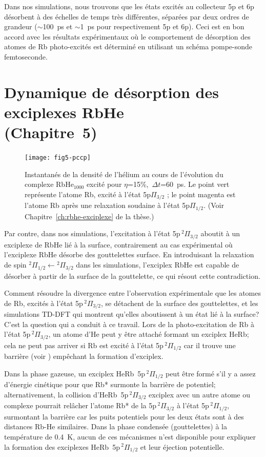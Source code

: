 		Dans nos simulations, nous trouvons que les états excités au collecteur 5p et 6p désorbent à des échelles de temps très différentes, séparées par deux ordres de grandeur ($\sim$100~ps et $\sim$1~ps pour respectivement 5p et 6p). Ceci est en bon accord avec les résultats expérimentaux où le comportement de désorption des atomes de Rb photo-excités est déterminé en utilisant un schéma pompe-sonde femtoseconde.

	\section*{Dynamique de désorption des exciplexes RbHe\\\small(Chapitre~5)}
		\begin{figure}
			\centering
			\texttt{[image: fig5-pccp]}\caption{Instantanés de la densité de l'hélium au cours de l'évolution du complexe RbHe$_{1000}$ excité pour $\eta$=15\%,~$\Delta t$=60~ps. Le point vert représente l'atome Rb, excité à l'état 5p$\Pi_{3/2}$ ; le point magenta est l'atome Rb après une relaxation soudaine à l'état 5p$\Pi_{1/2}$. (Voir Chapitre~\ref{ch:rbhe-exciplexe} de la thèse.)}
			\label{fig:snapshots}
		\end{figure}	
		Par contre, dans nos simulations, l'excitation à l'état 5p$\,^2\Pi_{3/2}$ aboutit à un exciplexe de RbHe lié à la surface, contrairement au cas expérimental où l'exciplexe RbHe désorbe des gouttelettes surface. En introduisant la relaxation de spin $^2\Pi_{1/2}\!\leftarrow\!^2\Pi_{3/2}$ dans les simulations, l'exciplex RbHe est capable de désorber à partir de la surface de la gouttelette, ce qui résout cette contradiction.
		
		Comment résoudre la divergence entre l'observation expérimentale que les atomes de Rb, excités à l'état 5p$\,^2\Pi_{3/2}$, se détachent de la surface des gouttelettes, et les simulations TD-DFT qui montrent qu'elles aboutissent à un état lié à la surface? C'est la question qui a conduit à ce travail. Lors de la photo-excitation de Rb à l'état 5p$\,^2\Pi_{3/2}$, un atome d'He peut y être attaché formant un exciplex HeRb; cela ne peut pas arriver si Rb est excité à l'état 5p$\,^2\Pi_{1/2}$ car il trouve une barrière (voir ) empêchant la formation d'exciplex.
		
		Dans la phase gazeuse, un exciplex HeRb~5p$\,^2\Pi_{1/2}$ peut être formé s'il y a assez d'énergie cinétique pour que Rb* surmonte la barrière de potentiel; alternativement, la collision d'HeRb~5p$\,^2\Pi_{3/2}$ exciplex avec un autre atome ou complexe pourrait relâcher l'atome Rb* de la 5p$\,^2\Pi_{3/2}$ à l'état 5p$\,^2\Pi_{1/2}$, surmontant la barrière car les puits potentiels pour les deux états sont à des distances Rb-He similaires. Dans la phase condensée (gouttelettes) à la température de 0.4~K, aucun de ces mécanismes n'est disponible pour expliquer la formation des exciplexes HeRb~5p$\,^2\Pi_{1/2}$ et leur éjection potentielle.
		
